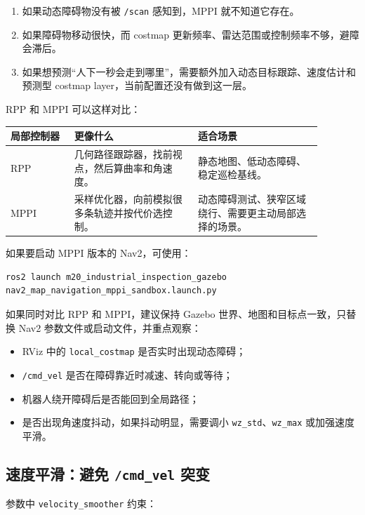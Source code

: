 \documentclass[UTF8,11pt,a4paper]{ctexart}
\begin{document}
\begin{enumerate}
  \item 如果动态障碍物没有被 \texttt{/scan} 感知到，MPPI 就不知道它存在。
  \item 如果障碍物移动很快，而 costmap 更新频率、雷达范围或控制频率不够，避障会滞后。
  \item 如果想预测“人下一秒会走到哪里”，需要额外加入动态目标跟踪、速度估计和预测型 costmap layer，当前配置还没有做到这一层。
\end{enumerate}

RPP 和 MPPI 可以这样对比：

\begin{longtable}{p{0.18\linewidth}p{0.35\linewidth}p{0.35\linewidth}}
\toprule
局部控制器 & 更像什么 & 适合场景 \\
\midrule
RPP & 几何路径跟踪器，找前视点，然后算曲率和角速度。& 静态地图、低动态障碍、稳定巡检基线。\\
MPPI & 采样优化器，向前模拟很多条轨迹并按代价选控制。& 动态障碍测试、狭窄区域绕行、需要更主动局部选择的场景。\\
\bottomrule
\end{longtable}

如果要启动 MPPI 版本的 Nav2，可使用：

\begin{verbatim}
ros2 launch m20_industrial_inspection_gazebo nav2_map_navigation_mppi_sandbox.launch.py
\end{verbatim}

如果同时对比 RPP 和 MPPI，建议保持 Gazebo 世界、地图和目标点一致，只替换 Nav2 参数文件或启动文件，并重点观察：

\begin{itemize}
  \item RViz 中的 \texttt{local\_costmap} 是否实时出现动态障碍；
  \item \texttt{/cmd\_vel} 是否在障碍靠近时减速、转向或等待；
  \item 机器人绕开障碍后是否能回到全局路径；
  \item 是否出现角速度抖动，如果抖动明显，需要调小 \texttt{wz\_std}、\texttt{wz\_max} 或加强速度平滑。
\end{itemize}

\subsection{速度平滑：避免 \texttt{/cmd\_vel} 突变}

参数中 \texttt{velocity\_smoother} 约束：
\end{document}
